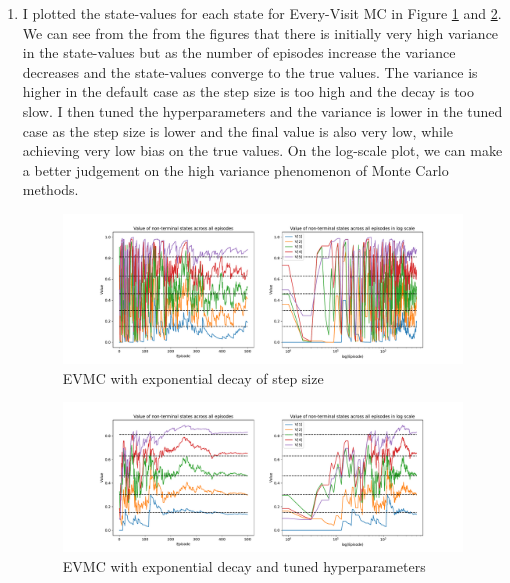 \begin{enumerate}
    \item I plotted the state-values for each state for Every-Visit MC in Figure \ref{fig:default_evmc} and \ref{fig:tuned_evmc}. We can see from the from the figures that there is initially very high variance in the state-values but as the number of episodes increase the variance decreases and the state-values converge to the true values. The variance is higher in the default case as the step size is too high and the decay is too slow. I then tuned the hyperparameters and the variance is lower in the tuned case as the step size is lower and the final value is also very low, while achieving very low bias on the true values. On the log-scale plot, we can make a better judgement on the high variance phenomenon of Monte Carlo methods.
    \begin{figure}[h]
        \centering
        \includegraphics[width=\textwidth]{images/mc_td/every_visit_exponential_0.5_0.01_episode_values.pdf}
        \caption{EVMC with exponential decay of step size}
        \label{fig:default_evmc}
    \end{figure}

    \begin{figure}[h]
        \centering
        \includegraphics[width=\textwidth]{images/mc_td/every_visit_exponential_0.1_0.0008_episode_values.pdf}
        \caption{EVMC with exponential decay and tuned hyperparameters}
        \label{fig:tuned_evmc}
    \end{figure}


\end{enumerate}
